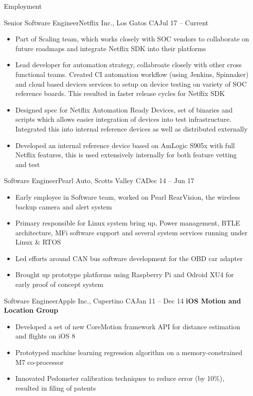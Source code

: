 \documentclass[]{mcdowellcv}
\begin{document}
	\makeheader
	
	\begin{cvsection}{Employment}
		\begin{cvsubsection}{Senior Software Engineer}{Netflix Inc., Los Gatos CA}{Jul 17 -- Current}
			\begin{itemize}
				\item Part of Scaling team, which works closely with SOC vendors to collaborate on future roadmaps and integrate Netflix SDK into their platforms 
				\item Lead developer for automation strategy, collabroate closely with other cross functional teams. Created CI automation workflow (using Jenkins, Spinnaker) and cloud based devices services to setup on device testing on variety of SOC reference boards. This resulted in faster release cycles for Netflix SDK
				\item Designed spec for Netflix Automation Ready Devices, set of binaries and scripts which allows easier integration of devices into test infrastructure. Integrated this into internal reference devices as well as distributed externally
				\item Developed an internal reference device based on AmLogic S905x with full Netflix features, this is used extensively internally for both feature vetting and test

			\end{itemize}
		\end{cvsubsection}

		\begin{cvsubsection}{Software Engineer}{Pearl Auto, Scotts Valley CA}{Dec 14 -- Jun 17}
			\begin{itemize}
				\item Early employee in Software team, worked on Pearl RearVision, the wireless backup camera and alert system
				\item Primary responsible for Linux system bring up, Power management, BTLE architecture, MFi software support and several system services running under Linux \& RTOS
				\item Led efforts around CAN bus software development for the OBD car adapter
				\item Brought up prototype platforms using Raspberry Pi and Odroid XU4 for early proof of concept system
			\end{itemize}
		\end{cvsubsection}
		
		\begin{cvsubsection}{Software Engineer}{Apple Inc., Cupertino CA}{Jan 11 -- Dec 14}	
			\textbf{iOS Motion and Location Group}
			\begin{itemize}
				\item Developed a set of new CoreMotion framework API for distance estimation and flights on iOS 8
				\item Prototyped machine learning regression algorithm on a memory-constrained M7 co-processor
				\item Innovated Pedometer calibration techniques to reduce error (by 10\%), resulted in filing of patents
			\end{itemize}


\end{cvsubsection}
\end{cvsection}
\end{document}
